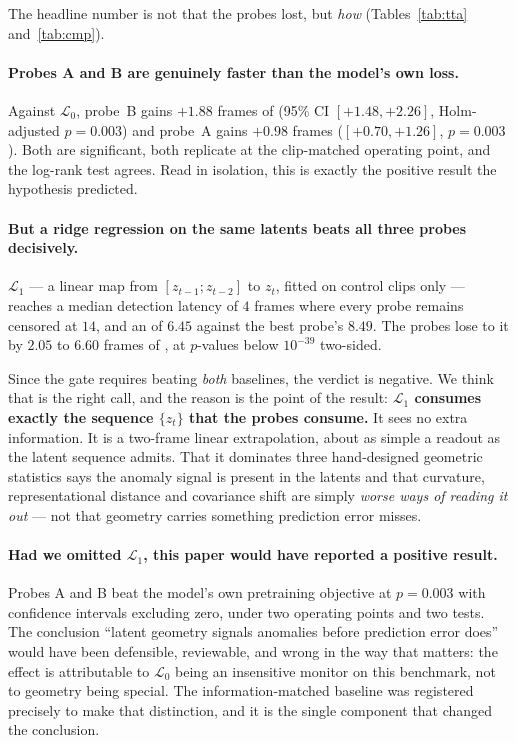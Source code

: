 The headline number is not that the probes lost, but \emph{how}
(Tables~\ref{tab:tta} and~\ref{tab:cmp}).

\paragraph{Probes A and B are genuinely faster than the model's own loss.}
Against $\mathcal{L}_0$, probe~B gains $+1.88$ frames of \RMTA{}
(95\% CI $[+1.48, +2.26]$, Holm-adjusted $p = 0.003$) and probe~A gains $+0.98$
frames ($[+0.70, +1.26]$, $p = 0.003$). Both are significant, both replicate at
the clip-matched operating point, and the log-rank test agrees. Read in
isolation, this is exactly the positive result the hypothesis predicted.

\paragraph{But a ridge regression on the same latents beats all three probes
decisively.} $\mathcal{L}_1$ --- a linear map from $[z_{t-1}; z_{t-2}]$ to
$z_t$, fitted on control clips only --- reaches a median detection latency of
$4$ frames where every probe remains censored at $14$, and an \RMTA{} of $6.45$
against the best probe's $8.49$. The probes lose to it by $2.05$ to $6.60$
frames of \RMTA{}, at $p$-values below $10^{-39}$ two-sided.

Since the gate requires beating \emph{both} baselines, the verdict is negative.
We think that is the right call, and the reason is the point of the result:
\textbf{$\mathcal{L}_1$ consumes exactly the sequence $\{z_t\}$ that the probes
consume.} It sees no extra information. It is a two-frame linear extrapolation,
about as simple a readout as the latent sequence admits. That it dominates three
hand-designed geometric statistics says the anomaly signal is present in the
latents and that curvature, representational distance and covariance shift are
simply \emph{worse ways of reading it out} --- not that geometry carries
something prediction error misses.

\paragraph{Had we omitted $\mathcal{L}_1$, this paper would have reported a
positive result.} Probes A and B beat the model's own pretraining objective at
$p = 0.003$ with confidence intervals excluding zero, under two operating
points and two tests. The conclusion ``latent geometry signals anomalies before
prediction error does'' would have been defensible, reviewable, and wrong in the
way that matters: the effect is attributable to $\mathcal{L}_0$ being an
insensitive monitor on this benchmark, not to geometry being special. The
information-matched baseline was registered precisely to make that
distinction, and it is the single component that changed the conclusion.

